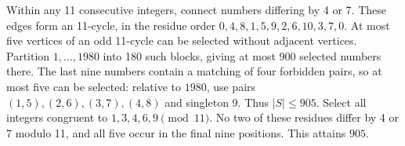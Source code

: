 Within any 11 consecutive integers, connect numbers differing by 4 or 7. These edges form an 11-cycle, in the residue order $0,4,8,1,5,9,2,6,10,3,7,0$. At most five vertices of an odd 11-cycle can be selected without adjacent vertices. Partition $1,\ldots,1980$ into 180 such blocks, giving at most 900 selected numbers there. The last nine numbers contain a matching of four forbidden pairs, so at most five can be selected: relative to $1980$, use pairs $(1,5),(2,6),(3,7),(4,8)$ and singleton 9. Thus $|S|\le905$. Select all integers congruent to $1,3,4,6,9\pmod{11}$. No two of these residues differ by 4 or 7 modulo 11, and all five occur in the final nine positions. This attains $\boxed{905}$.
